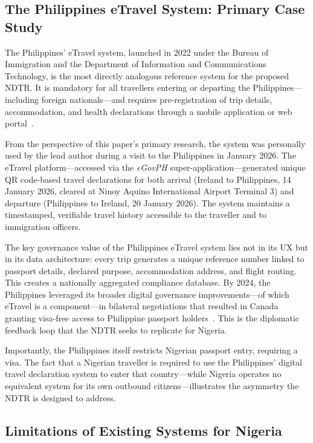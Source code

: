 \documentclass[11pt]{article}
\begin{document}
\subsection{The Philippines eTravel System: Primary Case Study}

The Philippines' eTravel system, launched in 2022 under the Bureau of
Immigration and the Department of Information and Communications
Technology, is the most directly analogous reference system for the
proposed NDTR. It is mandatory for all travellers entering or departing
the Philippines---including foreign nationals---and requires
pre-registration of trip details, accommodation, and health declarations
through a mobile application or web portal~\cite{philippinesetravel2022}.

From the perspective of this paper's primary research, the system was
personally used by the lead author during a visit to the Philippines in
January 2026. The eTravel platform---accessed via the \textit{eGovPH}
super-application---generated unique QR code-based travel declarations
for both arrival (Ireland to Philippines, 14 January 2026, cleared at
Ninoy Aquino International Airport Terminal 3) and departure
(Philippines to Ireland, 20 January 2026). The system maintains a
timestamped, verifiable travel history accessible to the traveller and
to immigration officers.

The key governance value of the Philippines eTravel system lies not in
its UX but in its data architecture: every trip generates a unique
reference number linked to passport details, declared purpose,
accommodation address, and flight routing. This creates a nationally
aggregated compliance database. By 2024, the Philippines leveraged its
broader digital governance improvements---of which eTravel is a
component---in bilateral negotiations that resulted in Canada granting
visa-free access to Philippine passport holders~\cite{canada2024ph}.
This is the diplomatic feedback loop that the NDTR seeks to replicate
for Nigeria.

Importantly, the Philippines itself restricts Nigerian passport entry,
requiring a visa. The fact that a Nigerian traveller is required to
use the Philippines' digital travel declaration system to enter that
country---while Nigeria operates no equivalent system for its own
outbound citizens---illustrates the asymmetry the NDTR is designed to
address.

\subsection{Limitations of Existing Systems for Nigeria}
\end{document}
